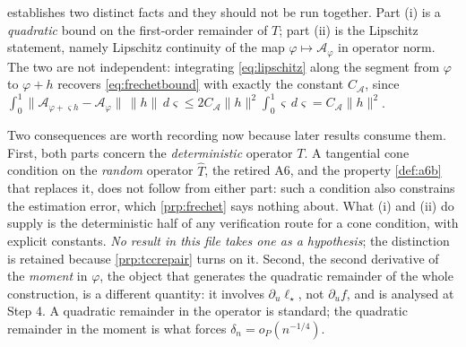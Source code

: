 \begin{remark}\label{rem:quadremainder}
 establishes two distinct facts and they should not be run together. Part (i) is a
\emph{quadratic} bound on the first-order remainder of $T$; part (ii) is the Lipschitz statement, namely
Lipschitz continuity of the map $\varphi\mapsto\mathcal A_\varphi$ in operator norm.
The two are not independent: integrating \eqref{eq:lipschitz} along
the segment from $\varphi$ to $\varphi+h$ recovers \eqref{eq:frechetbound} with exactly the constant
$C_{\!\mathcal A}$, since $\int_0^1\|\mathcal A_{\varphi+\varsigma h}-\mathcal A_\varphi\|\,\|h\|\,d\varsigma
\le2C_{\!\mathcal A}\|h\|^{2}\int_0^1\varsigma\,d\varsigma=C_{\!\mathcal A}\|h\|^{2}$.

Two consequences are worth recording now because later results consume them. First, both parts concern
the \emph{deterministic} operator $T$. A tangential cone condition on the \emph{random} operator
$\hat T$, the retired A6, and the property \cref{def:a6b} that replaces it, does not follow from
either part: such a condition also constrains the estimation error, which \cref{prp:frechet} says
nothing about. What (i) and (ii) do supply is the deterministic half of any verification route for a
cone condition, with explicit constants. \emph{No result in this file takes one as a hypothesis}; the
distinction is retained because \cref{prp:tccrepair} turns on it. Second, the second derivative of the \emph{moment}
in $\varphi$, the object that generates the quadratic remainder of the whole construction, is a
different quantity: it involves $\partial_u\ell_\star$, not $\partial_u f$, and is analysed at Step 4.
A quadratic remainder in the operator is standard; the quadratic remainder in the moment is what forces
$\delta_n=o_P(n^{-1/4})$.
\end{remark}


